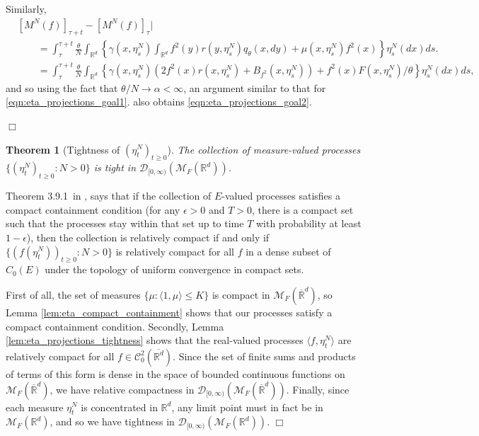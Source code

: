 \documentclass[12pt]{article}
\newenvironment {proof}{{\noindent\bf Proof }}{\hfill $\Box$ \medskip}
\newtheorem{theorem}{Theorem}[section]
\newcommand{\IR}{\mathbb R}
\newcommand{\measures}{\mathcal{M}_F(\IR^d)} %
\newcommand{\cmeasures}{\mathcal{M}_F(\overline{\IR}^d)} %
\begin{document}
\begin{proof}
Similarly,
\begin{align*}
    &
    [M^{N}(f)]_{\tau + t} 
        - [M^{N}(f)]_\tau \big|
    \\ & \qquad =
    \int_{\tau}^{\tau + t}
        \frac{\theta}{N}
        \int_{\IR^d}
        \left\{
            \gamma(x, \eta^N_s)
            \int_{\IR^d} f^2(y) r(y, \eta^N_s) q_\theta(x, dy)
            +
            \mu(x, \eta^N_s) f^2(x)
        \right\}
        \eta^N_s(dx)
    ds .
    \\ & \qquad =
    \int_{\tau}^{\tau + t}
        \frac{\theta}{N}
        \int_{\IR^d}
        \left\{
            \gamma(x, \eta^N_s)
            \left(
                2 f^2(x) r(x, \eta^N_s)
                +
                B_{f^2}(x, \eta^N_s)
            \right)
            +
            f^2(x) F(x, \eta^N_s) / \theta
        \right\}
        \eta^N_s(dx)
    ds ,
\end{align*}
and so using the fact that $\theta/N \to \alpha < \infty$,
an argument similar to 
that for \eqref{eqn:eta_projections_goal1}.
also obtains \eqref{eqn:eta_projections_goal2}.

\end{proof}

\begin{theorem}[Tightness of $(\eta^{N}_t)_{t \geq 0}$]
    The collection of measure-valued processes 
    $\{(\eta^{N}_t)_{t \geq 0}: N > 0\}$
    is tight in $\mathcal{D}_{[0,\infty)}(\measures)$.
\end{theorem}

\begin{proof}
    Theorem 3.9.1~in \cite{EK},
    says that if the collection of $E$-valued processes
    satisfies a compact containment condition
    (for any $\epsilon > 0$ and $T>0$, there is a compact set
    such that the processes stay within that set up to time $T$ with probability at least $1-\epsilon$),
    then the collection is relatively compact
    if and only if
    $\{(f(\eta^{N}_t))_{t \geq 0}: N > 0\}$ is relatively compact
    for all $f$ in a dense subset of $C_0(E)$
    under the topology of uniform convergence in compact sets.

    First of all,
    the set of measures $\{ \mu: \langle 1, \mu \rangle \leq K \} $ is compact in $\cmeasures$,
    so Lemma \ref{lem:eta_compact_containment}
    shows that our processes satisfy a compact containment condition.
    Secondly, Lemma \ref{lem:eta_projections_tightness}
    shows that the real-valued processes $\langle f, \eta^{N}_t \rangle$
    are relatively compact for all $f \in \mathcal{C}^{2}_{0}(\overline{\IR^d})$.
    Since the set of finite sums and products of terms of this form
    is dense in the space of bounded continuous functions on $\cmeasures$,
    we have relative compactness in $\mathcal{D}_{[0,\infty)}(\cmeasures)$.
    Finally,
    since each measure $\eta^{N}_t$ is concentrated in $\IR^d$,
    any limit point must in fact be in $\measures$,
    and so we have 
    tightness in $\mathcal{D}_{[0,\infty)}(\measures)$.
\end{proof}
\end{document}

